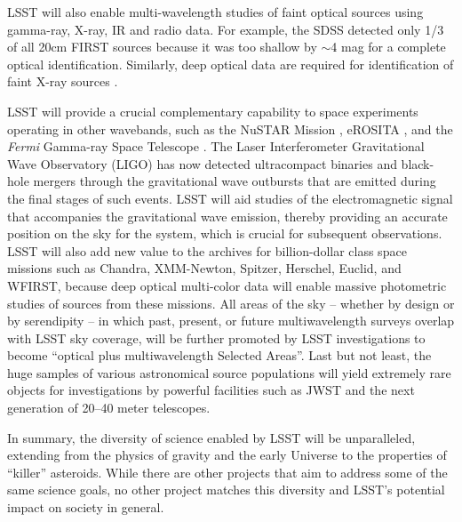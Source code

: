 LSST will also enable multi-wavelength studies of faint optical
sources using gamma-ray, X-ray, IR and radio data.  For example, the
SDSS detected only 1/3 of all 20cm FIRST sources \citep{1995ApJ...450..559B}
because it was too shallow by $\sim$4 mag for a complete optical
identification. Similarly, deep optical data are required for
identification of faint X-ray sources \citep{2005ARA&A..43..827B,2017AN....338..241B}.

LSST will provide a crucial complementary capability to space
experiments operating in other wavebands, such as the
NuSTAR Mission \citep{2013ApJ...770..103H},
eROSITA \citep{2012arXiv1209.3114M},
and the \textit{Fermi}
Gamma-ray Space Telescope \cite[e.g.,][]{2009ApJ...697.1071A}.
The Laser Interferometer Gravitational
Wave Observatory (LIGO) has now detected ultracompact binaries and black-hole mergers through the
gravitational wave outbursts that are emitted during the final stages of such events.
LSST will aid studies of  the electromagnetic signal that accompanies the gravitational wave emission,
thereby providing an accurate position on the sky for the system, which is
crucial for subsequent observations. LSST will also add new value to the archives for
billion-dollar class space missions such as Chandra, XMM-Newton,
Spitzer, Herschel, Euclid, and WFIRST,
because deep optical multi-color data will enable
massive photometric  studies of sources from these missions.
All areas of the sky -- whether by design or by serendipity -- in which past, present, or future
multiwavelength surveys overlap with LSST sky coverage, will be further promoted by LSST
investigations to become ``optical plus multiwavelength Selected Areas''.
Last but not least, the huge samples of various astronomical source
populations will yield extremely rare objects for investigations by powerful
facilities such as JWST \citep{2006SSRv..123..485G} and the next generation
of 20--40 meter telescopes.

In summary, the diversity of science enabled by LSST will be
unparalleled, extending from the physics of gravity and the
early Universe to the properties of ``killer'' asteroids. While
there are other projects that aim to address some of the same
science goals, no other project matches this diversity and
LSST's potential impact on society in general.
